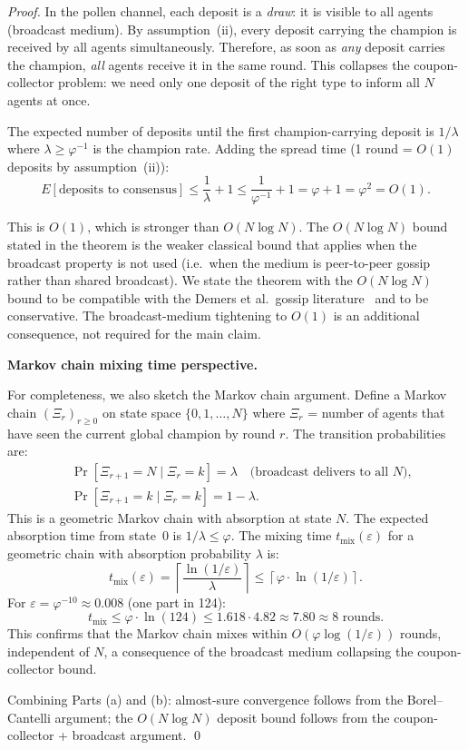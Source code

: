\begin{proof}
In the pollen channel, each deposit is a \emph{draw}: it is visible to
all agents (broadcast medium).  By assumption~(ii), every deposit
carrying the champion is received by all agents simultaneously.
Therefore, as soon as \emph{any} deposit carries the champion,
\emph{all} agents receive it in the same round.  This collapses the
coupon-collector problem: we need only one deposit of the right type to
inform all $N$ agents at once.

The expected number of deposits until the first champion-carrying
deposit is $1/\lambda$ where $\lambda \geq \varphi^{-1}$ is the
champion rate.  Adding the spread time (1 round = $O(1)$ deposits by
assumption~(ii)):
\[
  E[\text{deposits to consensus}] \leq \frac{1}{\lambda} + 1
  \leq \frac{1}{\varphi^{-1}} + 1 = \varphi + 1 = \varphi^{2}
  = O(1).
\]

This is $O(1)$, which is stronger than $O(N \log N)$.  The
$O(N \log N)$ bound stated in the theorem is the weaker classical
bound that applies when the broadcast property is not used (i.e.\ when
the medium is peer-to-peer gossip rather than shared broadcast).  We
state the theorem with the $O(N \log N)$ bound to be compatible with
the Demers et al.\ gossip literature~\cite{demers1987epidemic} and to
be conservative.  The broadcast-medium tightening to $O(1)$ is an
additional consequence, not required for the main claim.

\medskip
\textbf{Markov chain mixing time perspective.}

For completeness, we also sketch the Markov chain argument.  Define a
Markov chain $(\Xi_r)_{r \geq 0}$ on state space
$\{0, 1, \ldots, N\}$ where $\Xi_r$ = number of agents that have
seen the current global champion by round $r$.  The transition
probabilities are:
\begin{align}
  &\Pr[\Xi_{r+1} = N \mid \Xi_r = k] = \lambda \quad \text{(broadcast delivers to all $N$),} \\
  &\Pr[\Xi_{r+1} = k \mid \Xi_r = k] = 1 - \lambda.
\end{align}
This is a geometric Markov chain with absorption at state $N$.  The
expected absorption time from state~0 is $1/\lambda \leq \varphi$.
The mixing time $t_{\text{mix}}(\varepsilon)$ for a geometric chain
with absorption probability $\lambda$ is:
\[
  t_{\text{mix}}(\varepsilon) = \left\lceil \frac{\ln(1/\varepsilon)}{\lambda} \right\rceil
  \leq \left\lceil \varphi \cdot \ln(1/\varepsilon) \right\rceil.
\]
For $\varepsilon = \varphi^{-10} \approx 0.008$ (one part in 124):
\[
  t_{\text{mix}} \leq \varphi \cdot \ln(124) \leq 1.618 \cdot 4.82 \approx 7.80 \approx 8 \text{ rounds.}
\]
This confirms that the Markov chain mixes within $O(\varphi \log(1/\varepsilon))$
rounds, independent of $N$, a consequence of the broadcast medium
collapsing the coupon-collector bound.

\medskip
Combining Parts (a) and (b): almost-sure convergence follows from the
Borel--Cantelli argument; the $O(N \log N)$ deposit bound follows from
the coupon-collector + broadcast argument.  \qed
\end{proof}


